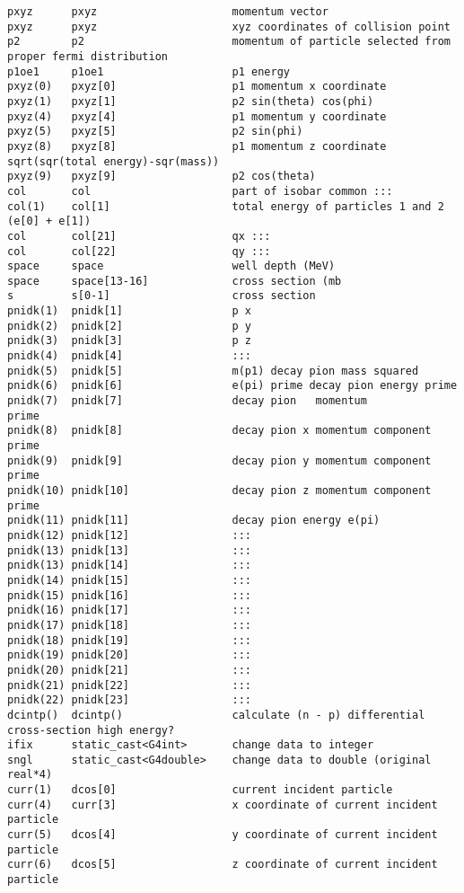 \begin{verbatim}
pxyz      pxyz                     momentum vector
pxyz      pxyz                     xyz coordinates of collision point
p2        p2                       momentum of particle selected from proper fermi distribution                
p1oe1     p1oe1                    p1 energy 
pxyz(0)   pxyz[0]                  p1 momentum x coordinate
pxyz(1)   pxyz[1]                  p2 sin(theta) cos(phi)
pxyz(4)   pxyz[4]                  p1 momentum y coordinate
pxyz(5)   pxyz[5]                  p2 sin(phi)
pxyz(8)   pxyz[8]                  p1 momentum z coordinate sqrt(sqr(total energy)-sqr(mass))  
pxyz(9)   pxyz[9]                  p2 cos(theta) 
col       col                      part of isobar common :::
col(1)    col[1]                   total energy of particles 1 and 2 (e[0] + e[1]) 
col       col[21]                  qx :::
col       col[22]                  qy :::  
space     space                    well depth (MeV)
space     space[13-16]             cross section (mb
s         s[0-1]                   cross section
pnidk(1)  pnidk[1]                 p x
pnidk(2)  pnidk[2]                 p y
pnidk(3)  pnidk[3]                 p z
pnidk(4)  pnidk[4]                 :::
pnidk(5)  pnidk[5]                 m(p1) decay pion mass squared
pnidk(6)  pnidk[6]                 e(pi) prime decay pion energy prime 
pnidk(7)  pnidk[7]                 decay pion   momentum           prime 
pnidk(8)  pnidk[8]                 decay pion x momentum component prime 
pnidk(9)  pnidk[9]                 decay pion y momentum component prime 
pnidk(10) pnidk[10]                decay pion z momentum component prime 
pnidk(11) pnidk[11]                decay pion energy e(pi) 
pnidk(12) pnidk[12]                :::
pnidk(13) pnidk[13]                :::
pnidk(13) pnidk[14]                :::
pnidk(14) pnidk[15]                :::
pnidk(15) pnidk[16]                :::
pnidk(16) pnidk[17]                :::
pnidk(17) pnidk[18]                :::
pnidk(18) pnidk[19]                :::
pnidk(19) pnidk[20]                :::
pnidk(20) pnidk[21]                :::
pnidk(21) pnidk[22]                :::
pnidk(22) pnidk[23]                :::
dcintp()  dcintp()                 calculate (n - p) differential cross-section high energy?
ifix      static_cast<G4int>       change data to integer
sngl      static_cast<G4double>    change data to double (original real*4)    
curr(1)   dcos[0]                  current incident particle
curr(4)   curr[3]                  x coordinate of current incident particle
curr(5)   dcos[4]                  y coordinate of current incident particle
curr(6)   dcos[5]                  z coordinate of current incident particle

\end{verbatim}
